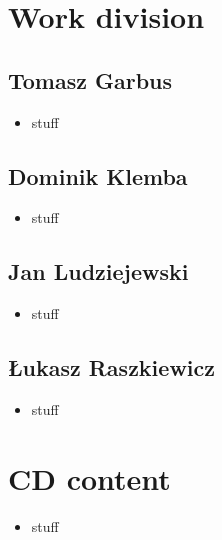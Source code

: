 \chapter{Work division}

\section{Tomasz Garbus}
    \begin{itemize}
        \item stuff
    \end{itemize}

\section{Dominik Klemba}
    \begin{itemize}
        \item stuff
    \end{itemize}

\section{Jan Ludziejewski}
    \begin{itemize}
        \item stuff
    \end{itemize}

\section{Łukasz Raszkiewicz}
    \begin{itemize}
        \item stuff
    \end{itemize}



\chapter{CD content}

\begin{itemize}
    \item stuff
\end{itemize}
